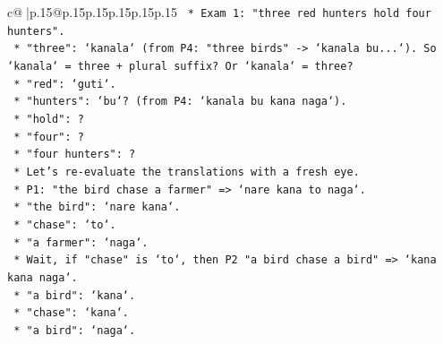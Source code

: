 \documentclass{article}
\begin{document}
{\begin{supertabular}{c@{$\;$}|p{.15\linewidth}@{}p{.15\linewidth}p{.15\linewidth}p{.15\linewidth}p{.15\linewidth}p{.15\linewidth}}
{{{\texttt{                                                                    *   Exam 1: "three red hunters hold four hunters".} \\
\texttt{                                                                        *   "three": `kanala` (from P4: "three birds" {-}> `kanala bu...`). So `kanala` = three + plural suffix? Or `kanala` = three?} \\
\texttt{                                                                        *   "red": `guti`.} \\
\texttt{                                                                        *   "hunters": `bu`? (from P4: `kanala bu kana naga`).} \\
\texttt{                                                                        *   "hold": ?} \\
\texttt{                                                                        *   "four": ?} \\
\texttt{                                                                        *   "four hunters": ?} \\
\texttt{                                                                    *   Let's re{-}evaluate the translations with a fresh eye.} \\
\texttt{                                                                    *   P1: "the bird chase a farmer" => `nare kana to naga`.} \\
\texttt{                                                                        *   "the bird": `nare kana`.} \\
\texttt{                                                                        *   "chase": `to`.} \\
\texttt{                                                                        *   "a farmer": `naga`.} \\
\texttt{                                                                        *   Wait, if "chase" is `to`, then P2 "a bird chase a bird" => `kana kana naga`.} \\
\texttt{                                                                            *   "a bird": `kana`.} \\
\texttt{                                                                            *   "chase": `kana`.} \\
\texttt{                                                                            *   "a bird": `naga`.} \\
}}}
\end{supertabular}}
\end{document}
